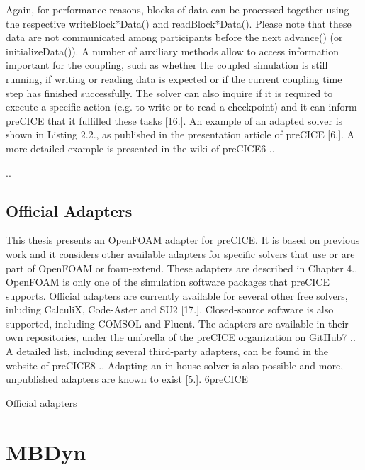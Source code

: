 Again, for performance reasons, blocks of data can be processed together using the
respective writeBlock*Data() and readBlock*Data(). Please note that these data are
not communicated among participants before the next advance() (or initializeData()).
A number of auxiliary methods allow to access information important for the coupling,
such as whether the coupled simulation is still running, if writing or reading data is expected
or if the current coupling time step has finished successfully. The solver can also inquire if
it is required to execute a specific action (e.g. to write or to read a checkpoint) and it can
inform preCICE that it fulfilled these tasks [16.].
An example of an adapted solver is shown in Listing 2.2., as published in the presentation
article of preCICE [6.]. A more detailed example is presented in the wiki of preCICE6
..




..


\subsection{Official Adapters}
\label{sec:pc-adapters}

This thesis presents an OpenFOAM adapter for preCICE. It is based on previous work and
it considers other available adapters for specific solvers that use or are part of OpenFOAM
or foam-extend. These adapters are described in Chapter 4..
OpenFOAM is only one of the simulation software packages that preCICE supports.
Official adapters are currently available for several other free solvers, inluding CalculiX,
Code-Aster and SU2 [17.]. Closed-source software is also supported, including COMSOL
and Fluent. The adapters are available in their own repositories, under the umbrella of the
preCICE organization on GitHub7
.. A detailed list, including several third-party adapters,
can be found in the website of preCICE8
.. Adapting an in-house solver is also possible and
more, unpublished adapters are known to exist [5.].
6preCICE

\cite{uekermann2017official} Official adapters




\section{MBDyn}
\label{sec:mbdyn}

